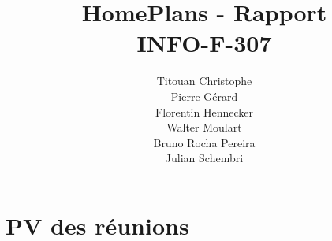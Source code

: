 \documentclass[a4paper, 12pt]{report}
\title{HomePlans - Rapport\\INFO-F-307}
\author{Titouan Christophe\\Pierre Gérard\\Florentin Hennecker\\Walter 
Moulart\\Bruno Rocha Pereira\\Julian Schembri}
\begin{document}
\maketitle
\tableofcontents



\appendix
\chapter{PV des réunions}

\end{document}
